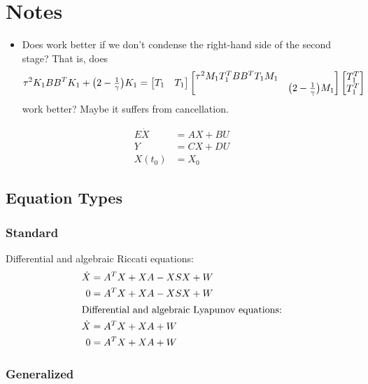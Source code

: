 \chapter{Notes}

\begin{itemize}
  \item
    Does  work better if we don't condense the right-hand side of the second stage?
    That is, does
    \begin{equation}
      \tau^2 K_1 BB^T K_1 + \big( 2-\tfrac{1}{\gamma} \big) K_1
      = \begin{bmatrix}
        T_1 & T_1
      \end{bmatrix}
      \begin{bmatrix}
        \tau^2 M_1 T_1^T BB^T T_1 M_1 \\
        &\big( 2-\tfrac{1}{\gamma} \big) M_1
      \end{bmatrix}
      \begin{bmatrix}
        T_1^T \\
        T_1^T
      \end{bmatrix}
    \end{equation}
    work better?
    Maybe it suffers from cancellation.
\end{itemize}

\begin{align}
  E\dot{X} &= AX + BU \\
  Y &= CX + DU \\
  X(t_0) &= X_0
\end{align}

\section{Equation Types}
\subsection{Standard}

Differential and algebraic Riccati equations:
\begin{align}
  \dot{X} &= A^T X + XA - XSX + W \\
  0 &= A^T X + XA - XSX + W \\
\intertext{Differential and algebraic Lyapunov equations:}
  \dot{X} &= A^T X + XA + W \\
  0 &= A^T X + XA + W
\end{align}

\subsection{Generalized}

